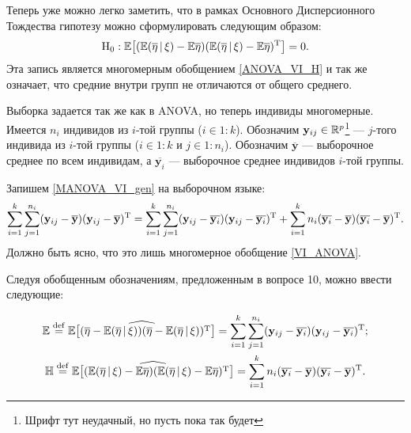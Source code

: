 Теперь уже можно легко заметить, что в рамках Основного Дисперсионного Тождества гипотезу можно сформулировать следующим образом:
\begin{gather}
    \label{MANOVA_VI_H}
    \mathrm H_0:
    \mathbb E \big[(\mathbb E (\overline \eta \, | \, \xi) - \mathbb E \overline \eta)
              (\mathbb E (\overline \eta \, | \, \xi) - \mathbb E \overline \eta)^{\mathrm{T}}\big]
    = 0.
\end{gather}
Эта запись является многомерным обобщением \eqref{ANOVA_VI_H} и так же означает, что средние внутри групп не отличаются от общего среднего.

Выборка задается так же как в ANOVA, но теперь индивиды многомерные.
Имеется $n_i$ индивидов из $i$-той группы ($i \in 1:k$).
Обозначим $\mathbf y_{ij} \in \mathbb{R}^p$\footnote{\color{blue} Шрифт тут неудачный, но пусть пока так будет}
--- $j$-того индивида из $i$-той группы ($i \in 1:k$ и $j \in 1:n_i$).
Обозначим $\overline {\mathbf y}$ --- выборочное среднее по всем индивидам, а $\overline {\mathbf y_i}$
--- выборочное среднее индивидов $i$-той группы.

Запишем \eqref{MANOVA_VI_gen} на выборочном языке:
\begin{gather}
    \label{VI_MANOVA}
    \sum_{i=1}^k \sum_{j=1}^{n_i} (\mathbf y_{ij} - \overline {\mathbf y}) (\mathbf y_{ij} - \overline {\mathbf y})^{\mathrm{T}} =
    \sum_{i=1}^k \sum_{j=1}^{n_i} (\mathbf y_{ij} - \overline {\mathbf y_i}) (\mathbf y_{ij} - \overline {\mathbf y_i})^{\mathrm{T}} +
    \sum_{i=1}^k n_i (\overline {\mathbf y_i} - \overline {\mathbf y}) (\overline {\mathbf y_i} - \overline {\mathbf y})^{\mathrm{T}}.
\end{gather}
Должно быть ясно, что это лишь многомерное обобщение \eqref{VI_ANOVA}.

Следуя обобщенным обозначениям, предложенным в вопросе 10, можно ввести следующие:

\begin{gather*}
    \mathrm {\mathbb E} \overset{\mathrm{def}}{=}
    \widehat {\mathbb E \big[(\overline \eta - \mathbb E (\overline \eta \, | \, \xi))
    (\overline \eta - \mathbb E (\overline \eta \, | \, \xi))^{\mathrm{T}}\big]} =
    \sum_{i=1}^k \sum_{j=1}^{n_i} (\mathbf y_{ij} - \overline {\mathbf y_i}) (\mathbf y_{ij} - \overline {\mathbf y_i})^{\mathrm{T}};\\
    \mathrm {\mathbb H} \overset{\mathrm{def}}{=}
    \widehat{\mathbb E \big[(\mathbb E (\overline \eta \, | \, \xi) - \mathbb E \overline \eta)
    (\mathbb E (\overline \eta \, | \, \xi) - \mathbb E \overline \eta)^{\mathrm{T}}\big]} =
    \sum_{i=1}^k n_i (\overline {\mathbf y_i} - \overline {\mathbf y}) (\overline {\mathbf y_i} - \overline {\mathbf y})^{\mathrm{T}}.
\end{gather*}

